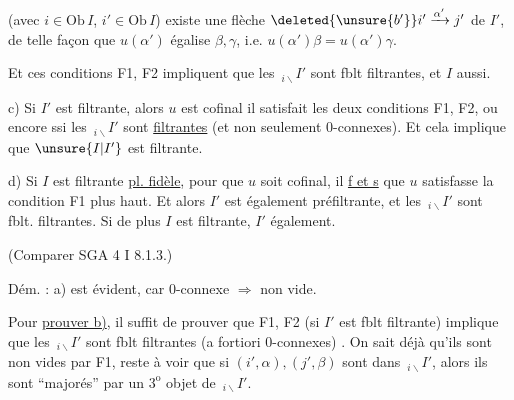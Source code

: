  (avec $i\in\mathrm{Ob}\,I$, $i'\in\mathrm{Ob}\,I$) existe une flèche $\deleted{\unsure{b'}}i'\xrightarrow{\alpha'}j'$ de $I'$, de telle façon que $u(\alpha')$ égalise $\beta,\gamma$, i.e. $u(\alpha')\beta=u(\alpha')\gamma$.

Et ces conditions F1, F2 impliquent que les $\,{}_{i\backslash}I'$ sont fblt filtrantes, et $I$ aussi.


c) Si $I'$ est filtrante, alors $u$ est cofinal  il satisfait les deux conditions F1, F2, ou  encore ssi les $\,{}_{i\backslash}I'$ sont  \uline{filtrantes} (et non seulement $0$-connexes). Et cela implique que $\unsure{I|I'}$ est  filtrante.

d) Si $I$ est filtrante   \uline{pl. fidèle}, pour que $u$ soit cofinal, il \uline{f et s} que $u$ satisfasse la condition F1 plus haut. Et alors $I'$ est également   préfiltrante, et les $\,{}_{i\backslash}I'$ sont fblt. filtrantes. Si de plus $I$ est   filtrante,  $I'$  également.

(Comparer SGA 4 I 8.1.3.)

Dém. : a)  est évident, car $0$-connexe $\Rightarrow$ non vide. 

Pour \uline{prouver b)}, il suffit de prouver que F1, F2 (si $I'$ est fblt filtrante) implique que les $\,{}_{i\backslash}I'$ sont fblt filtrantes (a fortiori $0$-connexes) . On sait déjà qu'ils sont non vides par F1, reste à voir que si $(i',\alpha),(j',\beta)$ sont dans $\,{}_{i\backslash}I'$, alors ils sont ``majorés'' par un $3^{\mathrm{o}}$ objet de $\,{}_{i\backslash}I'$.


